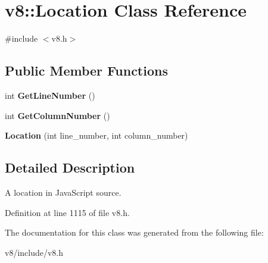 \hypertarget{classv8_1_1Location}{}\section{v8\+:\+:Location Class Reference}
\label{classv8_1_1Location}


{\ttfamily \#include $<$v8.\+h$>$}

\subsection*{Public Member Functions}
\begin{DoxyCompactItemize}
\item 
\mbox{\label{classv8_1_1Location_a078f1144721e1b66a6fa55b9b56af5dc}} 
int {\bfseries Get\+Line\+Number} ()
\item 
\mbox{\label{classv8_1_1Location_ab1a7deae060562733237734a1caf9045}} 
int {\bfseries Get\+Column\+Number} ()
\item 
\mbox{\label{classv8_1_1Location_a193b270e28ce9a0825522ab46c43745c}} 
{\bfseries Location} (int line\+\_\+number, int column\+\_\+number)
\end{DoxyCompactItemize}


\subsection{Detailed Description}
A location in Java\+Script source. 

Definition at line 1115 of file v8.\+h.



The documentation for this class was generated from the following file\+:\begin{DoxyCompactItemize}
\item 
v8/include/v8.\+h\end{DoxyCompactItemize}
